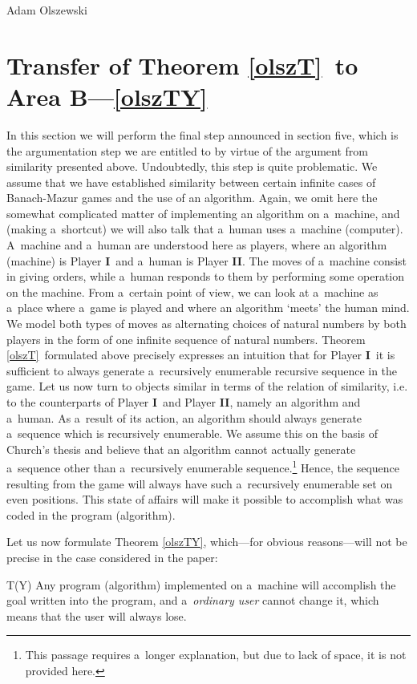 \begin{artengenv}{Adam Olszewski}
\section{Transfer of Theorem \ref{olszT}~to Area B---\ref{olszTY}}
In this section we will perform the final step announced in section five, which is the argumentation step we are entitled to by virtue of the argument from similarity presented above. Undoubtedly, this step is quite problematic. We assume that we have established similarity between certain infinite cases of Banach-Mazur games and the use of an algorithm. Again, we omit here the somewhat complicated matter of implementing an algorithm on a~machine, and (making a~shortcut) we will also talk that a~human uses a~machine (computer). A~machine and a~human are understood here as players, where an algorithm (machine) is Player \textbf{I}~and a~human is Player \textbf{II}. The moves of a~machine consist in giving orders, while a~human responds to them by performing some operation on the machine. From a~certain point of view, we can look at a~machine as a~place where a~game is played and where an algorithm ‘meets' the human mind. We model both types of moves as alternating choices of natural numbers by both players in the form of one infinite sequence of natural numbers. Theorem \ref{olszT}~formulated above precisely expresses an intuition that for Player \textbf{I}~it is sufficient to always generate a~recursively enumerable recursive sequence in the game. Let us now turn to objects similar in terms of the relation of similarity, i.e. to the counterparts of Player \textbf{I}~and Player \textbf{II}, namely an algorithm and a~human. As a~result of its action, an algorithm should always generate a~sequence which is recursively enumerable. We assume this on the basis of Church's thesis and believe that an algorithm cannot actually generate a~sequence other than a~recursively enumerable sequence.\footnote{This passage requires a~longer explanation, but due to lack of space, it is not provided here.} Hence, the sequence resulting from the game will always have such a~recursively enumerable set on even positions. This state of affairs will make it possible to accomplish what was coded in the program (algorithm).

Let us now formulate Theorem \ref{olszTY}, which---for obvious reasons---will not be precise in the case considered in the paper:
\begin{customthm}{T(Y)}\label{olszTY}
Any program (algorithm) implemented on a~machine will accomplish the goal written into the program, and a~\textit{ordinary user} cannot change it, which means that the user will always lose.
\end{customthm}

\end{artengenv}
